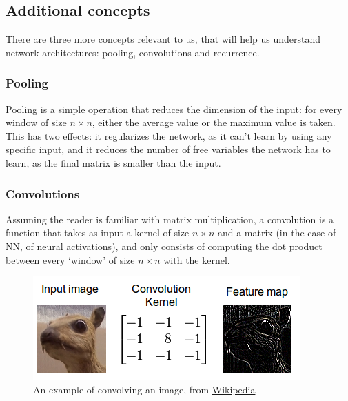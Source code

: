 \documentclass[../main.tex]{subfiles}
\begin{document}
\subsection{Additional concepts}
There are three more concepts relevant to us, that will help us understand network architectures: pooling, convolutions and recurrence.

\subsubsection{Pooling}
Pooling is a simple operation that reduces the dimension of the input: for every window of size $n\times n$, either the average value or the maximum value is taken. This has two effects: it regularizes the network, as it can't learn by using any specific input, and it reduces the number of free variables the network has to learn, as the final matrix is smaller than the input.

\subsubsection{Convolutions}
Assuming the reader is familiar with matrix multiplication, a convolution is a function that takes as input a kernel of size $n\times n$ and a matrix (in the case of NN, of neural activations), and only consists of computing the dot product between every `window' of size $n\times n$ with the kernel.
\begin{figure}[h]
    \caption{An example of convolving an image, from \href{https://en.wikipedia.org/wiki/Kernel_(image_processing)}{Wikipedia} }
    \includegraphics[width=\textwidth]{img/convolution.png}
\end{figure}
\end{document}
